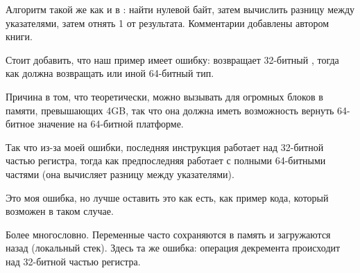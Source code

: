 ﻿




Алгоритм такой же как и в : 
найти нулевой байт, затем вычислить разницу между указателями, затем отнять 1 от результата.
Комментарии добавлены автором книги.

Стоит добавить, что наш пример имеет ошибку: 
возвращает 32-битный \Tint, тогда как должна возвращать  или иной 64-битный тип.

Причина в том, что теоретически,  можно вызывать для огромных блоков в памяти,
превышающих 4GB, так что она должна иметь возможность вернуть 64-битное значение на 64-битной платформе.

Так что из-за моей ошибки, последняя инструкция \SUB работает над 32-битной частью регистра, тогда
как предпоследняя \SUB работает с полными 64-битными частями (она вычисляет разницу между указателями).

Это моя ошибка, но лучше оставить это как есть, как пример кода, который возможен в таком случае.




Более многословно.
Переменные часто сохраняются в память и загружаются назад (локальный стек).
Здесь та же ошибка: операция декремента происходит над 32-битной частью регистра.


